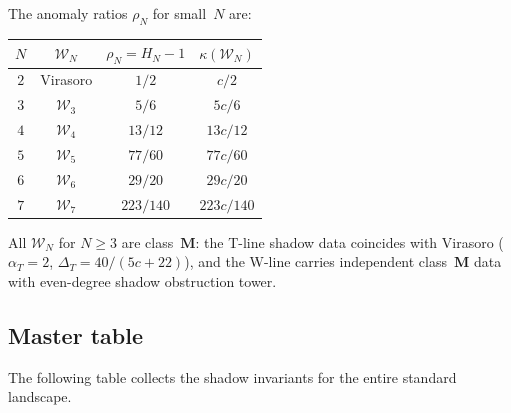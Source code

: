 \documentclass[11pt]{article}
\theoremstyle{plain}
\theoremstyle{definition}
\theoremstyle{remark}
\newcommand{\cW}{\mathcal{W}}
\begin{document}
The anomaly ratios $\rho_N$ for small~$N$ are:

\begin{center}
\renewcommand{\arraystretch}{1.2}
\begin{tabular}{cccc}
\toprule
$N$ & $\cW_N$ & $\rho_N = H_N - 1$ & $\kappa(\cW_N)$ \\
\midrule
$2$ & Virasoro & $1/2$ & $c/2$ \\
$3$ & $\cW_3$ & $5/6$ & $5c/6$ \\
$4$ & $\cW_4$ & $13/12$ & $13c/12$ \\
$5$ & $\cW_5$ & $77/60$ & $77c/60$ \\
$6$ & $\cW_6$ & $29/20$ & $29c/20$ \\
$7$ & $\cW_7$ & $223/140$ & $223c/140$ \\
\bottomrule
\end{tabular}
\end{center}

\noindent All $\cW_N$ for $N \geq 3$ are class~$\mathbf{M}$:
the T-line shadow data coincides with Virasoro
($\alpha_T = 2$, $\Delta_T = 40/(5c+22)$), and the W-line
carries independent class~$\mathbf{M}$ data with even-degree
shadow obstruction tower.


\subsection{Master table}
\label{subsec:master-table}

The following table collects the shadow invariants for
the entire standard landscape.
\end{document}
